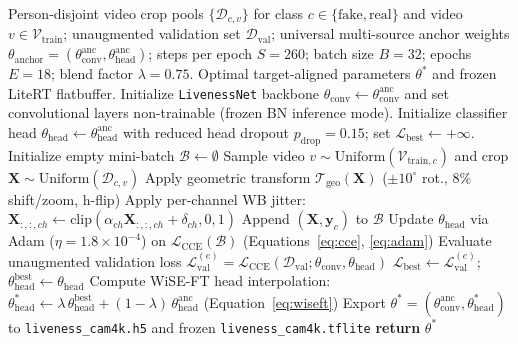 \begin{algorithm}[htbp]
\caption{Video-Balanced Aligned Transfer Training with WiSE-FT Head Interpolation}
\label{alg:training}
\small
\begin{algorithmic}[1]
\Require Person-disjoint video crop pools $\{\mathcal{D}_{c, v}\}$ for class $c \in \{\text{fake}, \text{real}\}$ and video $v \in \mathcal{V}_{\text{train}}$; unaugmented validation set $\mathcal{D}_{\text{val}}$; universal multi-source anchor weights $\theta_{\text{anchor}} = (\theta_{\text{conv}}^{\text{anc}}, \theta_{\text{head}}^{\text{anc}})$; steps per epoch $S = 260$; batch size $B = 32$; epochs $E = 18$; blend factor $\lambda = 0.75$.
\Ensure Optimal target-aligned parameters $\theta^*$ and frozen LiteRT flatbuffer.
\State Initialize \texttt{LivenessNet} backbone $\theta_{\text{conv}} \leftarrow \theta_{\text{conv}}^{\text{anc}}$ and set convolutional layers non-trainable (frozen BN inference mode).
\State Initialize classifier head $\theta_{\text{head}} \leftarrow \theta_{\text{head}}^{\text{anc}}$ with reduced head dropout $p_{\text{drop}} = 0.15$; set $\mathcal{L}_{\text{best}} \leftarrow +\infty$.
        \State Initialize empty mini-batch $\mathcal{B} \leftarrow \emptyset$
         
                \State Sample video $v \sim \text{Uniform}(\mathcal{V}_{\text{train}, c})$ and crop $\mathbf{X} \sim \text{Uniform}(\mathcal{D}_{c, v})$
                \State Apply geometric transform $\mathcal{T}_{\text{geo}}(\mathbf{X})$ ($\pm 10^\circ$ rot., $8\%$ shift/zoom, h-flip)
                    \State Apply per-channel WB jitter: $\mathbf{X}_{:,:,ch} \leftarrow \text{clip}(\alpha_{ch}\mathbf{X}_{:,:,ch} + \delta_{ch}, 0, 1)$
                \EndIf
                \State Append $(\mathbf{X}, \mathbf{y}_c)$ to $\mathcal{B}$
            \EndFor
        \EndFor
        \State Update $\theta_{\text{head}}$ via Adam ($\eta = 1.8 \times 10^{-4}$) on $\mathcal{L}_{\text{CCE}}(\mathcal{B})$ (Equations~\eqref{eq:cce}, \eqref{eq:adam})
    \EndFor
    \State Evaluate unaugmented validation loss $\mathcal{L}_{\text{val}}^{(e)} = \mathcal{L}_{\text{CCE}}(\mathcal{D}_{\text{val}}; \theta_{\text{conv}}, \theta_{\text{head}})$
        \State $\mathcal{L}_{\text{best}} \leftarrow \mathcal{L}_{\text{val}}^{(e)}$; \quad $\theta_{\text{head}}^{\text{best}} \leftarrow \theta_{\text{head}}$
    \EndIf
\EndFor
\State Compute WiSE-FT head interpolation: $\theta_{\text{head}}^* \leftarrow \lambda\,\theta_{\text{head}}^{\text{best}} + (1 - \lambda)\,\theta_{\text{head}}^{\text{anc}}$ (Equation~\eqref{eq:wiseft})
\State Export $\theta^* = (\theta_{\text{conv}}^{\text{anc}}, \theta_{\text{head}}^*)$ to \texttt{liveness\_cam4k.h5} and frozen \texttt{liveness\_cam4k.tflite}
\State \textbf{return} $\theta^*$
\end{algorithmic}
\end{algorithm}


